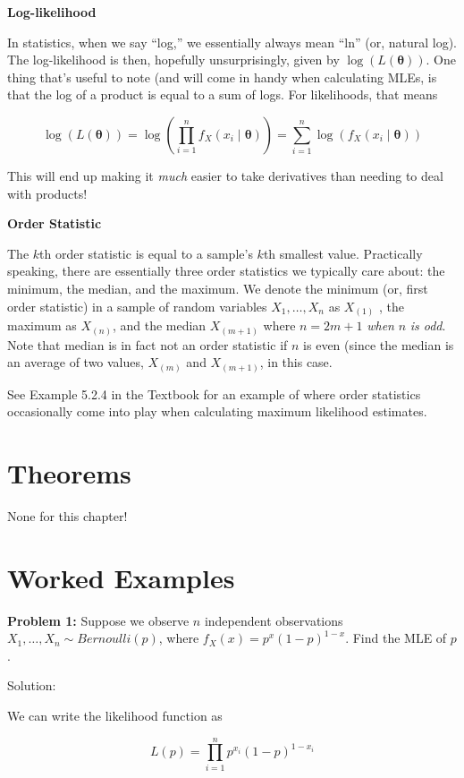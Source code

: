 \documentclass[
  letterpaper,
  DIV=11,
  numbers=noendperiod]{scrreprt}
\begin{document}
\textbf{Log-likelihood}

In statistics, when we say ``log,'' we essentially always mean ``ln''
(or, natural log). The log-likelihood is then, hopefully unsurprisingly,
given by \(\log(L(\boldsymbol{\theta}))\). One thing that's useful to
note (and will come in handy when calculating MLEs, is that the log of a
product is equal to a sum of logs. For likelihoods, that means

\[
\log(L(\boldsymbol{\theta})) = \log \left(\prod_{i = 1}^n f_X(x_i \mid \boldsymbol{\theta})\right) = \sum_{i = 1}^n \log(f_X(x_i \mid \boldsymbol{\theta}))
\]

This will end up making it \emph{much} easier to take derivatives than
needing to deal with products!

\textbf{Order Statistic}

The \(k\)th order statistic is equal to a sample's \(k\)th smallest
value. Practically speaking, there are essentially three order
statistics we typically care about: the minimum, the median, and the
maximum. We denote the minimum (or, first order statistic) in a sample
of random variables \(X_1, \dots, X_n\) as \(X_{(1)}\) , the maximum as
\(X_{(n)}\), and the median \(X_{(m+1)}\) where \(n = 2m + 1\)
\emph{when} \(n\) \emph{is odd}. Note that median is in fact not an
order statistic if \(n\) is even (since the median is an average of two
values, \(X_{(m)}\) and \(X_{(m+1)}\), in this case.

See Example 5.2.4 in the Textbook for an example of where order
statistics occasionally come into play when calculating maximum
likelihood estimates.

\section{Theorems}\label{theorems-1}

None for this chapter!

\section{Worked Examples}\label{worked-examples-1}

\textbf{Problem 1:} Suppose we observe \(n\) independent observations
\(X_1, \dots, X_n \sim Bernoulli(p)\), where
\(f_X(x) = p^x(1-p)^{1-x}\). Find the MLE of \(p\).

Solution:

We can write the likelihood function as

\[
L(p) = \prod_{i = 1}^n p^{x_i} (1-p)^{1 - x_i} 
\]
\end{document}
